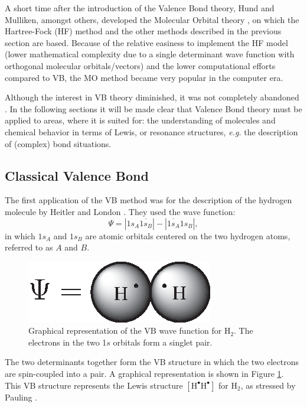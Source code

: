 A short time after the introduction of the Valence Bond theory, Hund and Mulliken, amongst others, developed the Molecular Orbital theory \cite{hund,mulliken}, on which the Hartree-Fock (HF) method and the other methods described in the previous section are based. Because of the relative easiness to implement the HF model (lower mathematical complexity due to a single determinant wave function with orthogonal molecular orbitals/vectors) and the lower computational efforts compared to VB, the MO method became very popular in the computer era.

Although the interest in VB theory diminished, it was not completely abandoned \cite{vboverv1,vboverv2,vboverv3}. In the following sections it will be made clear that Valence Bond theory must be applied to areas, where it is suited for: the understanding of molecules and chemical behavior in terms of Lewis, or resonance structures, \textit{e.g.} the description of (complex) bond situations.

\subsection{Classical Valence Bond}

The first application of the VB method was for the description of the hydrogen molecule by Heitler and London \cite{heitler}. They used the wave function:
\begin{equation}
\Psi = |1s_{A}\overline{1s_{B}}| - |\overline{1s_{A}}1s_{B}|,
\label{ch1.eq.hl}
\end{equation}
in which $1s_{A}$ and $1s_{B}$ are atomic orbitals centered on the two hydrogen atoms, referred to as $A$ and $B$.
\begin{figure}[htdp]
\center
\includegraphics[scale=1]{introduction/figures/heitler.eps}
\caption{Graphical representation of the VB wave function for $\mathrm{H_2}$. The electrons in the two 1$s$ orbitals form a singlet pair.}
\label{ch1.fig.heitler}
\end{figure}
The two determinants together form the VB structure in which the two electrons are spin-coupled into a pair. A graphical representation is shown in Figure \ref{ch1.fig.heitler}. This VB structure represents the Lewis structure $\mathrm{[H^\bullet H^\bullet]}$ for H$_2$, as stressed by Pauling \cite{hllewis}. 

